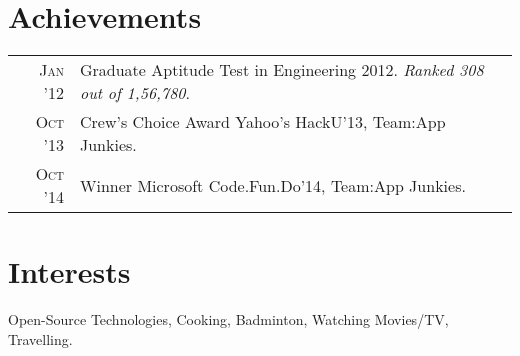 \documentclass[a4paper,10pt]{article}
\begin{document}
\section{Achievements}
\begin{tabular}{rp{15cm}}
\textsc{Jan '12} & Graduate Aptitude Test in Engineering 2012. \emph{Ranked 308 out of 1,56,780}.\\
\textsc{Oct '13} & Crew’s Choice Award Yahoo's HackU’13, Team:App Junkies.\\
\textsc{Oct '14} & Winner Microsoft Code.Fun.Do’14, Team:App Junkies.\\
\end{tabular}

\section{Interests}
Open-Source Technologies, Cooking, Badminton, Watching Movies/TV, Travelling.

\end{document}
